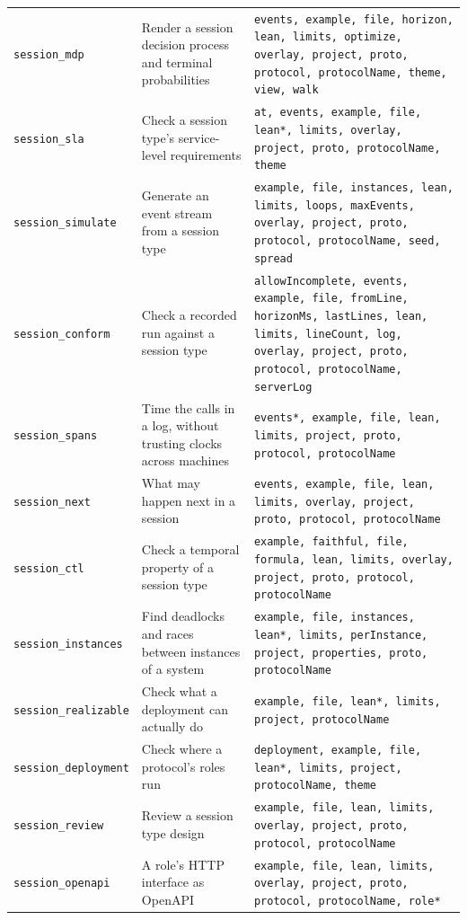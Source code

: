 \begin{tabular}{@{}p{}p{}p{}@{}}
\texttt{session\_\allowbreak{}mdp} & Render a session decision process and terminal probabilities & \texttt{events, example, file, horizon, lean, limits, optimize, overlay, project, proto, protocol, protocolName, theme, view, walk} \\
\texttt{session\_\allowbreak{}sla} & Check a session type's service-level requirements & \texttt{at, events, example, file, lean*, limits, overlay, project, proto, protocolName, theme} \\
\texttt{session\_\allowbreak{}simulate} & Generate an event stream from a session type & \texttt{example, file, instances, lean, limits, loops, maxEvents, overlay, project, proto, protocol, protocolName, seed, spread} \\
\texttt{session\_\allowbreak{}conform} & Check a recorded run against a session type & \texttt{allowIncomplete, events, example, file, fromLine, horizonMs, lastLines, lean, limits, lineCount, log, overlay, project, proto, protocol, protocolName, serverLog} \\
\texttt{session\_\allowbreak{}spans} & Time the calls in a log, without trusting clocks across machines & \texttt{events*, example, file, lean, limits, project, proto, protocol, protocolName} \\
\texttt{session\_\allowbreak{}next} & What may happen next in a session & \texttt{events, example, file, lean, limits, overlay, project, proto, protocol, protocolName} \\
\texttt{session\_\allowbreak{}ctl} & Check a temporal property of a session type & \texttt{example, faithful, file, formula, lean, limits, overlay, project, proto, protocol, protocolName} \\
\texttt{session\_\allowbreak{}instances} & Find deadlocks and races between instances of a system & \texttt{example, file, instances, lean*, limits, perInstance, project, properties, proto, protocolName} \\
\texttt{session\_\allowbreak{}realizable} & Check what a deployment can actually do & \texttt{example, file, lean*, limits, project, protocolName} \\
\texttt{session\_\allowbreak{}deployment} & Check where a protocol's roles run & \texttt{deployment, example, file, lean*, limits, project, protocolName, theme} \\
\texttt{session\_\allowbreak{}review} & Review a session type design & \texttt{example, file, lean, limits, overlay, project, proto, protocol, protocolName} \\
\texttt{session\_\allowbreak{}openapi} & A role's HTTP interface as OpenAPI & \texttt{example, file, lean, limits, overlay, project, proto, protocol, protocolName, role*} \\

\end{tabular}
